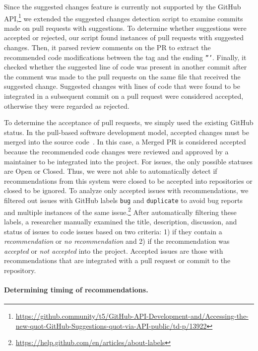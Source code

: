 Since the suggested changes feature is currently not supported by the GitHub API,\footnote{\url{https://github.community/t5/GitHub-API-Development-and/Accessing-the-new-quot-GitHub-Suggestions-quot-via-API-public/td-p/13922}} we extended the suggested changes detection script to examine commits made on pull requests with suggestions. To determine whether suggestions were accepted or rejected, our script found instances of pull requests with suggested changes. Then, it parsed review comments on the PR to extract the recommended code modifications between the \sugg tag and the ending \texttt{'''}. Finally, it checked whether the suggested line of code was present in another commit after the comment was made to the pull requests on the same file that received the suggested change. Suggested changes with lines of code that were found to be integrated in a subsequent commit on a pull request were considered accepted, otherwise they were regarded as rejected.

To determine the acceptance of pull requests, we simply used the existing GitHub status. In the pull-based software development model, accepted changes must be merged into the source code~\cite{gousios2014exploratory}. In this case, a Merged PR is considered accepted because the recommended code changes were reviewed and approved by a maintainer to be integrated into the project. For issues, the only possible statuses are Open or Closed. Thus, we were not able to automatically detect if recommendations from this system were closed to be accepted into repositories or closed to be ignored. To analyze only accepted issues with recommendations, we filtered out issues with GitHub labels \texttt{bug} and \texttt{duplicate} to avoid bug reports and multiple instances of the same issue.\footnote{\url{https://help.github.com/en/articles/about-labels}} After automatically filtering these labels, a researcher manually examined the title, description, discussion, and status of issues to code issues based on two criteria: 1) if they contain a \textit{recommendation} or \textit{no recommendation} and 2) if the recommendation was \textit{accepted} or \textit{not accepted} into the project. Accepted issues are those with recommendations that are integrated with a pull request or commit to the repository.

\paragraph{Determining timing of recommendations.}

